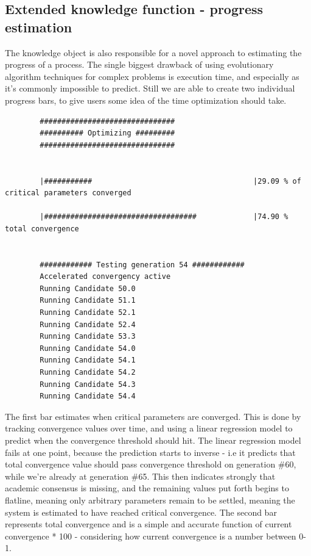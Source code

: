 \documentclass[a4paper,english]{report}
\begin{document}
		\subsection{Extended knowledge function - progress estimation}
		The knowledge object is also responsible for a novel approach to estimating the progress of a process. The single biggest drawback of using evolutionary algorithm techniques for complex problems is execution time, and especially as it's commonly impossible to predict. Still we are able to create two individual progress bars, to give users some idea of the time optimization should take.
		\linebreak
		\scriptsize
		\begin{verbatim}
		###############################
		########## Optimizing #########
		###############################
		
		
		|###########                                     |29.09 % of critical parameters converged
		
		|###################################             |74.90 % total convergence
		
		
		############ Testing generation 54 ############
		Accelerated convergency active
		Running Candidate 50.0
		Running Candidate 51.1
		Running Candidate 52.1
		Running Candidate 52.4
		Running Candidate 53.3
		Running Candidate 54.0
		Running Candidate 54.1
		Running Candidate 54.2
		Running Candidate 54.3
		Running Candidate 54.4

		\end{verbatim}
		\normalsize
		\pagebreak
		The first bar estimates when critical parameters are converged. This is done by tracking convergence values over time, and using a linear regression model to predict when the convergence threshold should hit. The linear regression model fails at one point, because the prediction starts to inverse - i.e it predicts that total convergence value should pass convergence threshold on generation \#60, while we're already at generation \#65. This then indicates strongly that academic consensus is missing, and the remaining values put forth begins to flatline, meaning only arbitrary parameters remain to be settled, meaning the system is estimated to have reached critical convergence. The second bar represents total convergence and is a simple and accurate function of current convergence * 100 - considering how current convergence is a number between 0-1.
\end{document}
